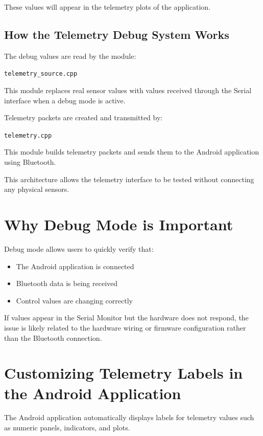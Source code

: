 These values will appear in the telemetry plots of the application.

\subsection{How the Telemetry Debug System Works}

The debug values are read by the module:

\begin{center}
	\texttt{telemetry\_source.cpp}
\end{center}

This module replaces real sensor values with values received through the
Serial interface when a debug mode is active.

Telemetry packets are created and transmitted by:

\begin{center}
	\texttt{telemetry.cpp}
\end{center}

This module builds telemetry packets and sends them to the Android
application using Bluetooth.

This architecture allows the telemetry interface to be tested without
connecting any physical sensors.


\section{Why Debug Mode is Important}

Debug mode allows users to quickly verify that:

\begin{itemize}
	\item The Android application is connected
	\item Bluetooth data is being received
	\item Control values are changing correctly
\end{itemize}

If values appear in the Serial Monitor but the hardware does not respond, the issue is likely related to the hardware wiring or firmware configuration rather than the Bluetooth connection.

\section{Customizing Telemetry Labels in the Android Application}

The Android application automatically displays labels for telemetry
values such as numeric panels, indicators, and plots.

